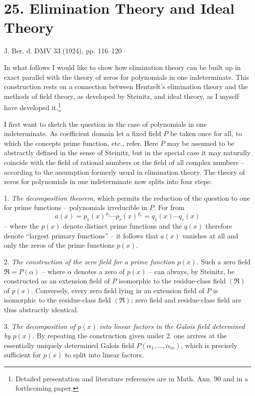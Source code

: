 \documentclass[11pt]{article}
\begin{document}
\section*{25. Elimination Theory and Ideal Theory}

\begin{center}
J. Ber. d. DMV 33 (1924), pp. 116--120
\end{center}

In what follows I would like to show how elimination theory can be built up in exact parallel with the theory of zeros for polynomials in one indeterminate. This construction rests on a connection between Hentzelt's elimination theory and the methods of field theory, as developed by Steinitz, and ideal theory, as I myself have developed it.\footnote{Detailed presentation and literature references are in Math. Ann. 90 and in a forthcoming paper.}

I first want to sketch the question in the case of polynomials in one indeterminate. As coefficient domain let a fixed field $P$ be taken once for all, to which the concepts prime function, etc., refer. Here $P$ may be assumed to be abstractly defined in the sense of Steinitz, but in the special case it may naturally coincide with the field of rational numbers or the field of all complex numbers -- according to the assumption formerly usual in elimination theory. The theory of zeros for polynomials in one indeterminate now splits into four steps:

1. \emph{The decomposition theorem}, which permits the reduction of the question to one for prime functions -- polynomials irreducible in $P$. For from
\[
 a(x)=p_1(x)^{\varrho_1}\cdots p_r(x)^{\varrho_r}=q_1(x)\cdots q_r(x)
\]
-- where the $p(x)$ denote distinct prime functions and the $q(x)$ therefore denote ``largest primary functions'' -- it follows that $a(x)$ vanishes at all and only the zeros of the prime functions $p(x)$.

2. \emph{The construction of the zero field for a prime function $p(x)$.} Such a zero field $\mathfrak R=P(\alpha)$ -- where $\alpha$ denotes a zero of $p(x)$ -- can always, by Steinitz, be constructed as an extension field of $P$ isomorphic to the residue-class field $(\mathfrak R)$ of $p(x)$. Conversely, every zero field lying in an extension field of $P$ is isomorphic to the residue-class field $(\mathfrak R)$; zero field and residue-class field are thus abstractly identical.

3. \emph{The decomposition of $p(x)$ into linear factors in the Galois field determined by $p(x)$.} By repeating the construction given under 2. one arrives at the essentially uniquely determined Galois field $P(\alpha_1,\ldots,\alpha_m)$, which is precisely sufficient for $p(x)$ to split into linear factors.
\end{document}
